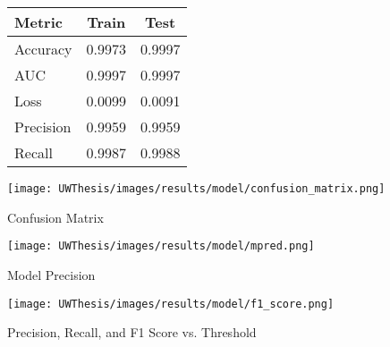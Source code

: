 \documentclass [11pt, proquest] {uwthesis}[2020/02/24]
\begin{document}
\begin{figure}[H]
\noindent
\begin{minipage}[t]{0.45\textwidth}
  \vspace{-13em}
  \captionsetup{type=table}
  \label{tab:model-evaluation-metrics}
  \vspace{0.5em}
  \centering
  \small %
  \begin{tabular}{@{}lcc@{}} %
    \toprule
    \textbf{Metric} & \textbf{Train} & \textbf{Test} \\
    \midrule
    Accuracy & 0.9973 & 0.9997 \\
    AUC & 0.9997 & 0.9997 \\
    Loss & 0.0099 & 0.0091 \\
    Precision & 0.9959 & 0.9959 \\
    Recall & 0.9987 & 0.9988 \\
    \bottomrule
  \end{tabular}
\end{minipage}%
\hfill
\begin{minipage}[t]{0.48\textwidth}
  \centering
  \texttt{[image: UWThesis/images/results/model/confusion\_matrix.png]}
  \caption{Confusion Matrix}
  \label{fig:conf-matrix}
\end{minipage}
\end{figure}

\begin{figure}[h]
  \centering
  \begin{minipage}{0.48\textwidth}
    \centering
    \texttt{[image: UWThesis/images/results/model/mpred.png]}
    \caption{Model Precision}
    \label{fig:model_precision}
  \end{minipage}
  \hfill
  \begin{minipage}{0.48\textwidth}
    \centering
    \texttt{[image: UWThesis/images/results/model/f1\_score.png]}
    \caption{Precision, Recall, and F1 Score vs. Threshold}
    \label{fig:model_f1_threshold}
  \end{minipage}
\end{figure}
\end{document}
